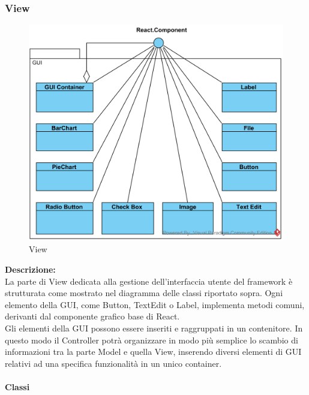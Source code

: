 \subsubsection{View}
\begin{figure}[H]
	\centering
	\includegraphics[width=14cm]{diagrammi_img/classi_e_package/gui_classes.png}
	\caption{View}
\end{figure}
\textbf{Descrizione:}\\
La parte di View dedicata alla gestione dell'interfaccia utente del framework è strutturata come mostrato nel diagramma delle classi riportato sopra.
Ogni elemento della GUI, come Button, TextEdit o Label, implementa metodi comuni, derivanti dal componente grafico base di React.\\
Gli elementi della GUI possono essere inseriti e raggruppati in un contenitore. In questo modo il Controller potrà organizzare in modo più semplice lo scambio di informazioni tra la parte Model e quella View, inserendo diversi elementi di GUI relativi ad una specifica funzionalità in un unico container.

\paragraph{Classi}\mbox{}


